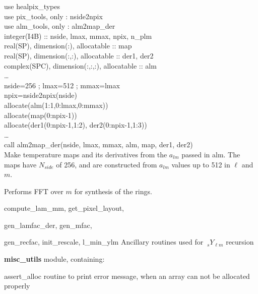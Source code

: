 \begin{example}
{
use healpix\_types \\
use pix\_tools, only : nside2npix \\
use alm\_tools, only : alm2map\_der \\
integer(I4B) :: nside, lmax, mmax, npix, n\_plm\\
real(SP), dimension(:), allocatable :: map \\
real(SP), dimension(:,:), allocatable :: der1, der2 \\
complex(SPC), dimension(:,:,:), allocatable :: alm \\
\ldots \\
nside=256 ; lmax=512 ; mmax=lmax\\
npix=nside2npix(nside)\\
allocate(alm(1:1,0:lmax,0:mmax))\\
allocate(map(0:npix-1))\\
allocate(der1(0:npix-1,1:2), der2(0:npix-1,1:3))\\
\ldots \\
call alm2map\_der(nside, lmax, mmax, alm, map, der1, der2)  \\
}
{
Make temperature maps and its derivatives from the $a_{lm}$ passed in alm. The maps have $N_{side}$ of 256, and are constructed from $a_{lm}$ values up to 512 in $\ell$ and $m$.
}
\end{example}

\begin{modules}
  \begin{sulist}{} %
  \item[\htmlref{ring\_synthesis}{sub:ring_synthesis}] Performs FFT over $m$ for synthesis of the rings.
  \item[compute\_lam\_mm, get\_pixel\_layout, ]
  \item[gen\_lamfac\_der, gen\_mfac,  ] 
  \item[gen\_recfac, init\_rescale, l\_min\_ylm] Ancillary routines used
  for $\ {_s}Y_{\ell m}$ recursion
  \item[\textbf{misc\_utils}] module, containing:
  \item[assert\_alloc] routine to print error message, when an array can not be
  allocated properly
  \end{sulist}
\end{modules}

